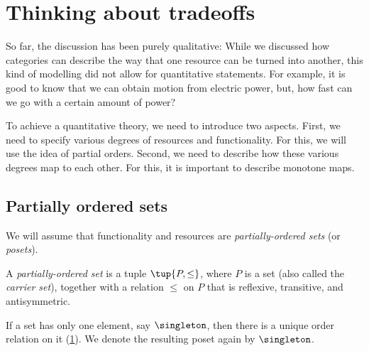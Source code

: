 \section{Thinking about tradeoffs}
So far, the discussion has been purely qualitative: While we discussed how
categories can describe the way that one resource can be turned into another,
this kind of modelling did not allow for quantitative statements. For example, it
is good to know that we can obtain motion from electric power, but, how fast can
we go with a certain amount of power?

To achieve a quantitative theory, we need to introduce two aspects.
First, we need to specify various degrees of resources and functionality.
For this, we will use the idea of partial orders.
Second, we need to describe how these various degrees map to each other.
For this, it is important to describe monotone maps.

\subsection{Partially ordered sets}

We will assume that functionality and resources
are \emph{partially-ordered sets} (or \emph{posets}).%



\begin{definition}
    A \emph{partially-ordered set} is a tuple $ \tup{P, \leq}$,
where $P$ is a set (also called the \emph{carrier set}), together with a
relation $\leq$ on $P$ that is reflexive, transitive, and antisymmetric.%
\end{definition}




\begin{example}\label{ex:singleton}
If a set has only one element, say $\singleton$, then there is a unique order relation on it (\cref{fig:singleton}). We denote the resulting poset again by $\singleton$.
\end{example}
\begin{figure}[h!]
   \centering
   \caption{\label{fig:singleton}}
\end{figure}


